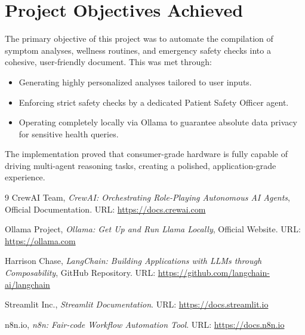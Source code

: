 \documentclass[12pt,a4paper]{report}
\begin{document}
\section{Project Objectives Achieved}
The primary objective of this project was to automate the compilation of symptom analyses, wellness routines, and emergency safety checks into a cohesive, user-friendly document. This was met through:
\begin{itemize}
    \item Generating highly personalized analyses tailored to user inputs.
    \item Enforcing strict safety checks by a dedicated Patient Safety Officer agent.
    \item Operating completely locally via Ollama to guarantee absolute data privacy for sensitive health queries.
\end{itemize}
The implementation proved that consumer-grade hardware is fully capable of driving multi-agent reasoning tasks, creating a polished, application-grade experience.

\begin{thebibliography}{9}
CrewAI Team, \textit{CrewAI: Orchestrating Role-Playing Autonomous AI Agents}, Official Documentation. URL: \url{https://docs.crewai.com}

Ollama Project, \textit{Ollama: Get Up and Run Llama Locally}, Official Website. URL: \url{https://ollama.com}

Harrison Chase, \textit{LangChain: Building Applications with LLMs through Composability}, GitHub Repository. URL: \url{https://github.com/langchain-ai/langchain}

Streamlit Inc., \textit{Streamlit Documentation}. URL: \url{https://docs.streamlit.io}

n8n.io, \textit{n8n: Fair-code Workflow Automation Tool}. URL: \url{https://docs.n8n.io}
\end{thebibliography}
\end{document}
